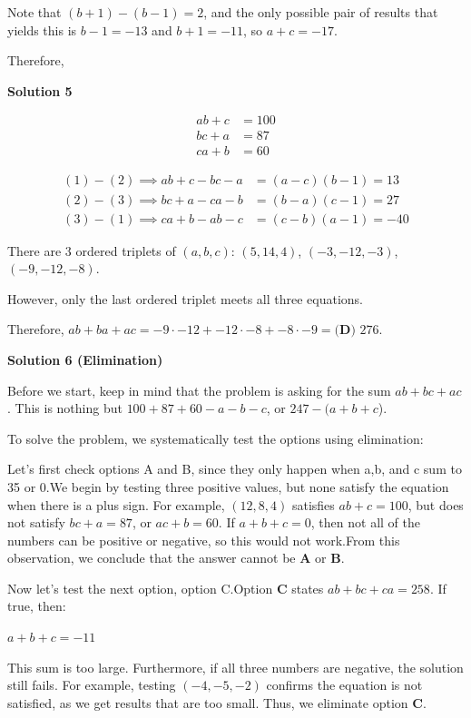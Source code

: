 \begin{enumerate}
 Note that $(b+1)-(b-1)=2$, and the only possible pair of results that yields this is $b-1=-13$ and $b+1=-11$, so $a+c=-17$. 

 Therefore, 

 



\textbf{Solution 5}


 \begin{align} ab + c &= 100 \\ bc + a &= 87 \\ ca + b &= 60 \end{align}

 \begin{align*}(1) - (2) \implies ab + c -bc - a &=(a-c)(b-1)=13 \\(2) - (3) \implies bc + a -ca - b &=(b-a)(c-1)=27 \\(3) - (1) \implies ca + b -ab - c &=(c-b)(a-1)=-40\end{align*}


 There are $3$ ordered triplets of $(a,b,c)$: $(5,14,4)$, $(-3,-12,-3)$, $(-9,-12,-8)$. 

 However, only the last ordered triplet meets all three equations.

 Therefore, $ab+ba+ac= -9\cdot-12+-12\cdot-8+-8\cdot-9 = \boxed{\textbf{(D) }276}.$




\textbf{Solution 6 (Elimination)}

Before we start, keep in mind that the problem is asking for the sum \(ab+bc+ac\). This is nothing but \(100+87+60-a-b-c\), or \(247-(a+b+c\)). 

 To solve the problem, we systematically test the options using elimination:

 Let's first check options A and B, since they only happen when a,b, and c sum to 35 or 0.We begin by testing three positive values, but none satisfy the equation when there is a plus sign. For example, \( (12, 8, 4) \) satisfies \( ab + c = 100 \), but does not satisfy \( bc + a = 87\), or \( ac + b = 60\). If \(a+b+c=0\), then not all of the numbers can be positive or negative, so this would not work.From this observation, we conclude that the answer cannot be \( \textbf{A} \) or \( \textbf{B} \).

 Now let's test the next option, option C.Option \( \textbf{C} \) states \( ab + bc + ca = 258 \). If true, then:

 \(a + b + c = -11\)

 This sum is too large. Furthermore, if all three numbers are negative, the solution still fails. For example, testing \( (-4, -5, -2) \) confirms the equation is not satisfied, as we get results that are too small. Thus, we eliminate option \( \textbf{C} \).


\end{enumerate}
